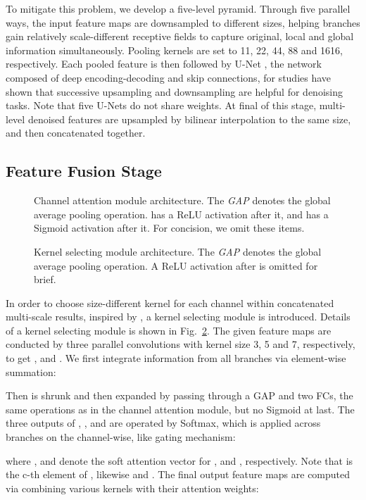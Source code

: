 \documentclass[conference]{IEEEtran}
\begin{document}
To mitigate this problem, we develop a five-level pyramid. Through five parallel ways, the input feature maps are downsampled to different sizes, helping branches gain relatively scale-different receptive fields to capture original, local and global information simultaneously. Pooling kernels are set to 11, 22, 44, 88 and 1616, respectively. Each pooled feature is then followed by U-Net \cite{u-net}, the network composed of deep encoding-decoding and skip connections, for studies have shown that successive upsampling and downsampling are helpful for denoising tasks. Note that five U-Nets do not share weights. At final of this stage, multi-level denoised features are upsampled by bilinear interpolation to the same size, and then concatenated together.
\subsection{Feature Fusion Stage}
\begin{figure}
\caption{Channel attention module architecture. The \emph{GAP} denotes the global average pooling operation. \emph{} has a ReLU activation after it, and \emph{} has a Sigmoid activation after it. For concision, we omit these items.}
\label{fig_se}
\end{figure}
\begin{figure}
\caption{Kernel selecting module architecture. The \emph{GAP} denotes the global average pooling operation. A ReLU activation after \emph{} is omitted for brief.}
\label{fig_sk}
\end{figure}
In order to choose size-different kernel for each channel within concatenated multi-scale results, inspired by \cite{SKnet}, a kernel selecting module is introduced.
Details of a kernel selecting module is shown in Fig.~\ref{fig_sk}. The given feature maps  are conducted by three parallel convolutions with kernel size 3, 5 and 7, respectively, to get ,  and . We first integrate information from all branches via element-wise summation:

Then  is shrunk and then expanded by passing through a GAP and two FCs, the same operations as in the channel attention module, but no Sigmoid at last. The three outputs of , ,  and  are operated by Softmax, which is applied across branches on the channel-wise, like gating mechanism:

where ,  and  denote the soft attention vector for ,  and , respectively. Note that  is the c-th element of , likewise  and . The final output feature maps  are computed via combining various kernels with their attention weights:
\end{document}
